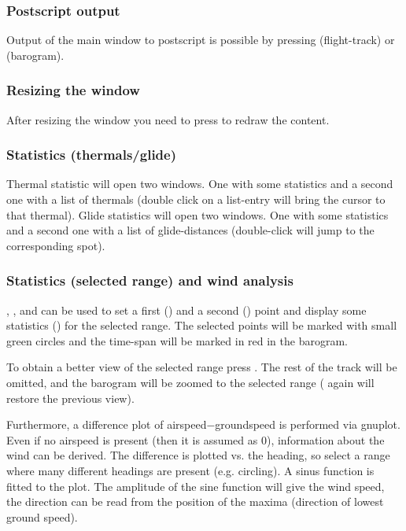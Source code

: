 \subsubsection{Postscript output}
Output of the main window to postscript is possible by pressing  (flight-track)
or  (barogram).

\subsubsection{Resizing the window}
After resizing the window you need to press  to redraw the content.


\subsubsection{Statistics (thermals/glide)}
Thermal statistic  will open two windows. One with some statistics and a
second one with a list of thermals (double click on a list-entry will bring the cursor to that thermal).
Glide statistics  will open two windows. One with some statistics and a
second one with a list of glide-distances (double-click will jump to the corresponding spot).

\subsubsection{Statistics (selected range) and wind analysis}
, , and  can be used to set a first () and a second () point and
display some statistics () for the selected range. The selected points will be
marked with small green circles and the time-span will be marked in red in the barogram.

To obtain a better view of the selected range press . The rest of the track will be omitted, and the
barogram will be zoomed to the selected range ( again will restore the previous view).

Furthermore, a difference plot of airspeed$-$groundspeed is performed via gnuplot. Even if no airspeed is present
(then it is assumed as 0), information about the wind can be derived. The difference is plotted vs. the heading,
so select a range where many different headings are present (e.g. circling). A sinus function is fitted to the plot.
The amplitude of the sine function will give the wind speed, the direction can be read from the position of the maxima (direction of lowest ground speed).


